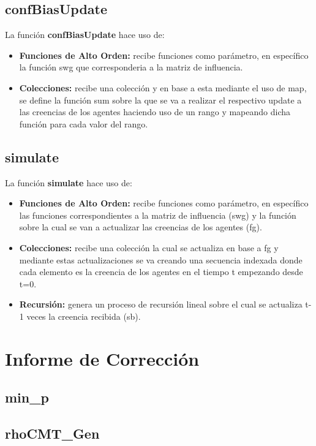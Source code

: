 \documentclass{article}
\begin{document}
    \subsection{confBiasUpdate}
    La función \textbf{confBiasUpdate} hace uso de:

    \begin{itemize}
      \item \textbf{Funciones de Alto Orden:} recibe funciones como parámetro, en específico la función swg que corresponderia a la matriz de influencia.
      \item \textbf{Colecciones:} recibe una colección y en base a esta mediante el uso de map, se define la función sum sobre la que se va a realizar el respectivo update a las creencias de los agentes haciendo uso de un rango y mapeando dicha función para cada valor del rango.
    \end{itemize}

    \subsection{simulate}
    La función \textbf{simulate} hace uso de:

    \begin{itemize}
      \item \textbf{Funciones de Alto Orden:} recibe funciones como parámetro, en específico las funciones correspondientes a la matriz de influencia (swg) y la función sobre la cual se van a actualizar las creencias de los agentes (fg).
      \item \textbf{Colecciones:} recibe una colección la cual se actualiza en base a fg y mediante estas actualizaciones se va creando una secuencia indexada donde cada elemento es la creencia de los agentes en el tiempo t empezando desde t=0.
      \item \textbf{Recursión:} genera un proceso de recursión lineal sobre el cual se actualiza t-1 veces la creencia recibida (sb).
    \end{itemize}

  \section{Informe de Corrección}

    \subsection{min\_p}

    \subsection{rhoCMT\_Gen}
	
\end{document}
